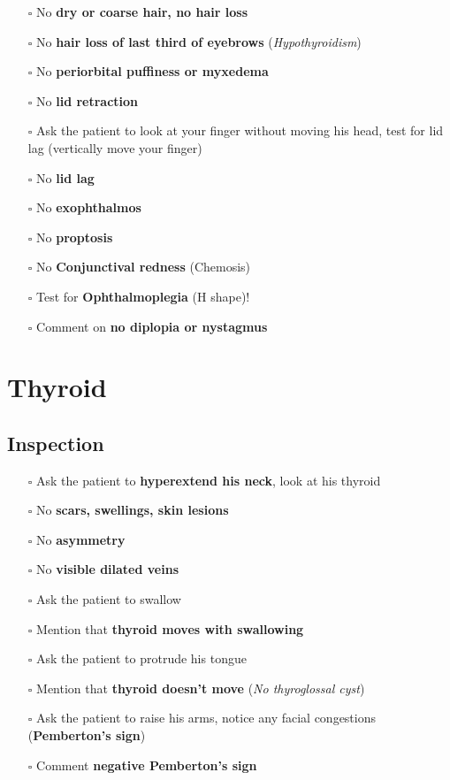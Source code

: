 \documentclass[
  13.5pt,
  a4paper,
  DIV=11,
  numbers=noendperiod]{scrreprt}
\providecommand{\tightlist}{%
  \setlength{\itemsep}{0pt}\setlength{\parskip}{0pt}}
\begin{document}
\begin{itemize}
\tightlist
\item[$\square$]
  No \textbf{dry or coarse hair, no hair loss}
\item[$\square$]
  No \textbf{hair loss of last third of eyebrows}
  (\emph{Hypothyroidism})
\item[$\square$]
  No \textbf{periorbital puffiness or myxedema}
\item[$\square$]
  No \textbf{lid retraction}
\item[$\square$]
  Ask the patient to look at your finger without moving his head, test
  for lid lag (vertically move your finger)
\item[$\square$]
  No \textbf{lid lag}
\item[$\square$]
  No \textbf{exophthalmos}
\item[$\square$]
  No \textbf{proptosis}
\item[$\square$]
  No \textbf{Conjunctival redness} (Chemosis)
\item[$\square$]
  Test for \textbf{Ophthalmoplegia} (H shape)!
\item[$\square$]
  Comment on \textbf{no diplopia or nystagmus}
\end{itemize}

\section{Thyroid}\label{thyroid}

\subsection{Inspection}\label{inspection-2}

\begin{itemize}
\tightlist
\item[$\square$]
  Ask the patient to \textbf{hyperextend his neck}, look at his thyroid
\item[$\square$]
  No \textbf{scars, swellings, skin lesions}
\item[$\square$]
  No \textbf{asymmetry}
\item[$\square$]
  No \textbf{visible dilated veins}
\item[$\square$]
  Ask the patient to swallow
\item[$\square$]
  Mention that \textbf{thyroid moves with swallowing}
\item[$\square$]
  Ask the patient to protrude his tongue
\item[$\square$]
  Mention that \textbf{thyroid doesn't move} (\emph{No thyroglossal
  cyst})
\item[$\square$]
  Ask the patient to raise his arms, notice any facial congestions
  (\textbf{Pemberton's sign})
\item[$\square$]
  Comment \textbf{negative Pemberton's sign}
\end{itemize}
\end{document}
